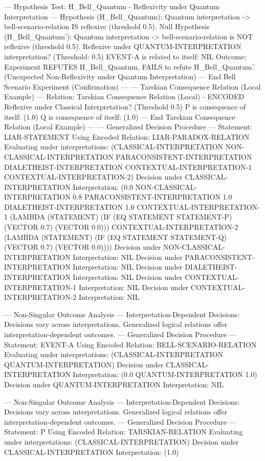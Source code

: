 --- Hypothesis Test: H\_Bell\_Quantum - Reflexivity under Quantum
Interpretation --- Hypothesis (H\_Bell\_Quantum): Quantum interpretation
-\textgreater{} bell-scenario-relation IS reflexive (threshold 0.5).
Null Hypothesis (H\_Bell\_Quantum'): Quantum interpretation
-\textgreater{} bell-scenario-relation is NOT reflexive (threshold 0.5).
Reflexive under QUANTUM-INTERPRETATION interpretation? (Threshold: 0.5)
EVENT-A is related to itself: NIL Outcome: Experiment REFUTES
H\_Bell\_Quantum, FAILS to refute H\_Bell\_Quantum'. (Unexpected
Non-Reflexivity under Quantum Interpretation) --- End Bell Scenario
Experiment (Confirmation) --- --- Tarskian Consequence Relation (Local
Example) --- Relation: Tarskian Consequence Relation (Local) - ENCODED
Reflexive under Classical Interpretation? (Threshold 0.5) P is
consequence of itself: (1.0) Q is consequence of itself: (1.0) --- End
Tarskian Consequence Relation (Local Example) --- --- Generalized
Decision Procedure --- Statement: LIAR-STATEMENT Using Encoded Relation:
LIAR-PARADOX-RELATION Evaluating under interpretations:
(CLASSICAL-INTERPRETATION NON-CLASSICAL-INTERPRETATION
PARACONSISTENT-INTERPRETATION DIALETHEIST-INTERPRETATION
CONTEXTUAL-INTERPRETATION-1 CONTEXTUAL-INTERPRETATION-2) Decision under
CLASSICAL-INTERPRETATION Interpretation: (0.0
NON-CLASSICAL-INTERPRETATION 0.8 PARACONSISTENT-INTERPRETATION 1.0
DIALETHEIST-INTERPRETATION 1.0 CONTEXTUAL-INTERPRETATION-1 (LAMBDA
(STATEMENT) (IF (EQ STATEMENT STATEMENT-P) (VECTOR 0.7) (VECTOR 0.0)))
CONTEXTUAL-INTERPRETATION-2 (LAMBDA (STATEMENT) (IF (EQ STATEMENT
STATEMENT-Q) (VECTOR 0.7) (VECTOR 0.0)))) Decision under
NON-CLASSICAL-INTERPRETATION Interpretation: NIL Decision under
PARACONSISTENT-INTERPRETATION Interpretation: NIL Decision under
DIALETHEIST-INTERPRETATION Interpretation: NIL Decision under
CONTEXTUAL-INTERPRETATION-1 Interpretation: NIL Decision under
CONTEXTUAL-INTERPRETATION-2 Interpretation: NIL

--- Non-Singular Outcome Analysis --- Interpretation-Dependent
Decisions: Decisions vary across interpretations. Generalized logical
relations offer interpretation-dependent outcomes. --- Generalized
Decision Procedure --- Statement: EVENT-A Using Encoded Relation:
BELL-SCENARIO-RELATION Evaluating under interpretations:
(CLASSICAL-INTERPRETATION QUANTUM-INTERPRETATION) Decision under
CLASSICAL-INTERPRETATION Interpretation: (0.0 QUANTUM-INTERPRETATION
1.0) Decision under QUANTUM-INTERPRETATION Interpretation: NIL

--- Non-Singular Outcome Analysis --- Interpretation-Dependent
Decisions: Decisions vary across interpretations. Generalized logical
relations offer interpretation-dependent outcomes. --- Generalized
Decision Procedure --- Statement: P Using Encoded Relation:
TARSKIAN-RELATION Evaluating under interpretations:
(CLASSICAL-INTERPRETATION) Decision under CLASSICAL-INTERPRETATION
Interpretation: (1.0)

